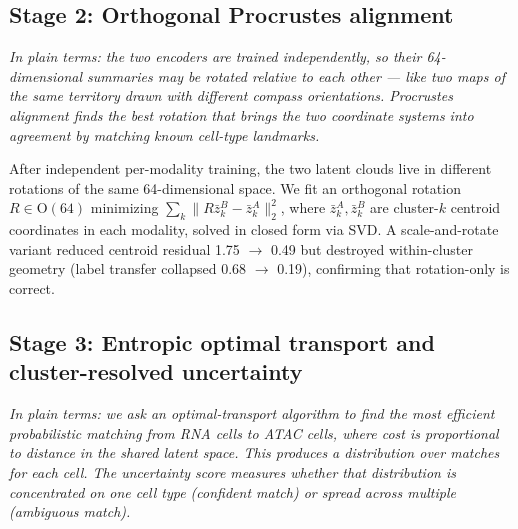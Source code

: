 \documentclass[pmlr]{jmlr}
\begin{document}
\subsection{Stage 2: Orthogonal Procrustes alignment}
\label{sec:procrustes}

\textit{In plain terms: the two encoders are trained independently, so their 64-dimensional summaries may be rotated relative to each other --- like two maps of the same territory drawn with different compass orientations. Procrustes alignment finds the best rotation that brings the two coordinate systems into agreement by matching known cell-type landmarks.}

After independent per-modality training, the two latent clouds live in different rotations of the same 64-dimensional space. We fit an orthogonal rotation $R \in \mathrm{O}(64)$ minimizing $\sum_k \| R \bar{z}^B_k - \bar{z}^A_k \|_2^2$, where $\bar{z}^A_k, \bar{z}^B_k$ are cluster-$k$ centroid coordinates in each modality, solved in closed form via SVD. A scale-and-rotate variant reduced centroid residual 1.75 $\to$ 0.49 but destroyed within-cluster geometry (label transfer collapsed 0.68 $\to$ 0.19), confirming that rotation-only is correct.

\subsection{Stage 3: Entropic optimal transport and cluster-resolved uncertainty}
\label{sec:sinkhorn}

\textit{In plain terms: we ask an optimal-transport algorithm to find the most efficient probabilistic matching from RNA cells to ATAC cells, where cost is proportional to distance in the shared latent space. This produces a distribution over matches for each cell. The uncertainty score measures whether that distribution is concentrated on one cell type (confident match) or spread across multiple (ambiguous match).}
\end{document}
